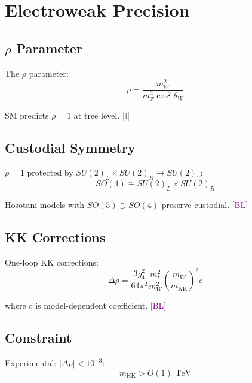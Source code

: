 \documentclass[11pt,a4paper]{article}
\newcommand{\tagI}{\textcolor{gray}{[I]}}
\newcommand{\tagBL}{\textcolor{purple}{[BL]}}
\begin{document}
\section{Electroweak Precision}

\subsection{$\rho$ Parameter}

The $\rho$ parameter:
\begin{equation}
\label{eq:rho-def}
\rho = \frac{m_W^2}{m_Z^2 \cos^2\theta_W}
\end{equation}

SM predicts $\rho = 1$ at tree level. \tagI

\subsection{Custodial Symmetry}

$\rho = 1$ protected by $SU(2)_L \times SU(2)_R \to SU(2)_V$:
\begin{equation}
\label{eq:custodial}
SO(4) \cong SU(2)_L \times SU(2)_R
\end{equation}

Hosotani models with $SO(5) \supset SO(4)$ preserve custodial. \tagBL

\subsection{KK Corrections}

One-loop KK corrections:
\begin{equation}
\label{eq:rho-kk}
\Delta\rho = \frac{3g_4^2}{64\pi^2} \frac{m_t^2}{m_W^2} \left(\frac{m_W}{m_{\text{KK}}}\right)^2 c
\end{equation}

where $c$ is model-dependent coefficient. \tagBL

\subsection{Constraint}

Experimental: $|\Delta\rho| < 10^{-3}$:
\begin{equation}
\label{eq:rho-constraint}
m_{\text{KK}} > O(1) \text{ TeV}
\end{equation}
\end{document}

